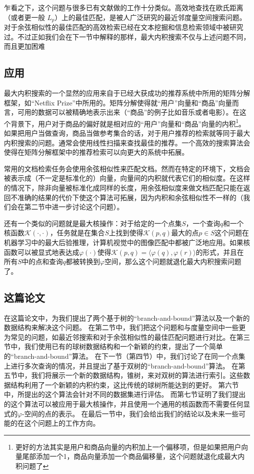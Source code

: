 \documentclass[twocolumn,a4paper]{article}
\begin{document}
乍看之下，这个问题与很多已有文献做的工作十分类似。高效地查找在欧氏距离（或者更一般 $L_p$）上的最佳匹配，是被人广泛研究的最近邻度量空间搜索问题。对于余弦相似性的最佳匹配的高效检索已经在文本挖掘和信息检索领域中被研究过。不过正如我们会在下一节中解释的那样，最大内积搜索不仅与上述问题不同，而且更加困难

\subsection{应用}
最大内积搜索的一个显然的应用来自于已经大获成功的推荐系统中所用的矩阵分解框架，如“Netflix Prize”中所用的。矩阵分解使得就“用户”向量和“商品”向量而言，可用的数据可以被精确地表示出来（“商品”的例子比如音乐或者电影）。在这个背景下，用户对于商品的偏好就是相对应的“用户”向量和“商品”向量的内积\footnote{更好的方法其实是用户和商品向量的内积加上一个偏移项，但是如果把用户向量尾部添加一个1，商品向量添加一个商品偏移量，这个问题就退化成最大内积问题了}。如果把用户当做查询，商品当做参考集合的话，对于用户推荐的检索就等同于最大内积搜索的问题。通常会使用线性扫描来查找最佳的推荐。一个高效的搜索算法会使得在矩阵分解框架中的推荐检索可以向更大的系统中拓展。

常用的文档检索任务会使用余弦相似性来匹配文档。然而在特定的环境下，文档会被表示成（不一定是标准化的）向量，向量间的内积就代表它们的相似度。在这样的情况下，除非向量被标准化成同样的长度，用余弦相似度来做文档匹配只能在返回不准确的结果的代价下使这个算法可拓展，因为内积和余弦相似性不一样的（我们会在第二节中进一步讨论这个问题）。

还有一个类似的问题就是最大核操作：对于给定的一个点集$S$，一个查询$q$和一个核函数$\mathcal{K}(\cdot,\cdot)$，任务就是在集合$S$上找到使得$\mathcal{K}(p,q)$最大的点$p \in S$这个问题在机器学习中的最大后验推理，计算机视觉中的图像匹配中都被广泛地应用。如果核函数可以被显式地表达成$\varphi(\cdot)$使得$\mathcal{K}(p,q) = \langle \varphi(q), \varphi(r) \rangle$的形式，并且在所有$S$中的点和查询$q$都被转换到$\varphi$空间，那么这个问题就退化最大内积搜索问题了。

\subsection{这篇论文}
在这篇论文中，为我们提出了两个基于树的“branch-and-bound”算法以及一个新的数据结构来解决这个问题。
在第二节中，我们把这个问题和与度量空间中一些更为常见的问题，如最近邻搜索和对于余弦相似性的最佳匹配问题进行对比。在第三节中，我们使用已有的球树数据结构和一个新颖的约束，提出了一个简单的“branch-and-bound”算法。
在下一节（第四节）中，我们讨论了在同一个点集上进行多次查询的情况，并且提出了基于双树的“branch-and-bound”算法。
在第五节中，我们将展示一个新的数据结构，锥树，来对双树的算法进行索引。这些数据结构利用了一个新颖的内积约束，这比传统的球树所能达到的更好。
第六节中，所提出的这个算法会针对不同的数据集进行评估。
而第七节证明了我们提出的这个算法可以被应用于最大核操作，并且使用一个通用的核函数而不需要任何显式的$\varphi$-空间的点的表示。
在最后一节中，我们会给出我们的结论以及未来一些可能的在这个问题上的工作方向。
\end{document}
